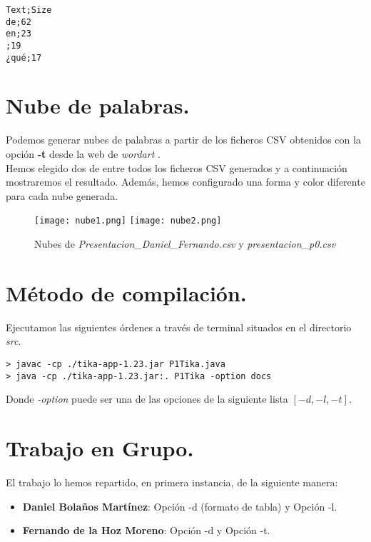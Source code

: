 \documentclass[12pt]{article}
\begin{document}
\begin{lstlisting}
Text;Size
de;62
en;23
;19
¿qué;17
\end{lstlisting}


\section{Nube de palabras.}

Podemos generar nubes de palabras a partir de los ficheros CSV obtenidos con la opción \textbf{-t} desde la web de \textit{wordart} \cite{Nube}.\\

Hemos elegido dos de entre todos los ficheros CSV generados y a continuación mostraremos el resultado. Además, hemos configurado una forma y color diferente para cada nube generada.

\clearpage

\begin{figure}[h]
\centering
\texttt{[image: nube1.png]}
\texttt{[image: nube2.png]}
\label{nubes}
\caption{Nubes de \textit{Presentacion\_Daniel\_Fernando.csv} y \textit{presentacion\_p0.csv}}
\end{figure}
\clearpage

\section{Método de compilación.}

Ejecutamos las siguientes órdenes a través de terminal situados en el directorio \textit{src}.

\begin{lstlisting}
> javac -cp ./tika-app-1.23.jar P1Tika.java
> java -cp ./tika-app-1.23.jar:. P1Tika -option docs
\end{lstlisting}

Donde \textit{-option} puede ser una de las opciones de la siguiente lista $[-d,-l,-t]$.

\section{Trabajo en Grupo.}

El trabajo lo hemos repartido, en primera instancia, de la siguiente manera:

\begin{itemize}
\item \textbf{Daniel Bolaños Martínez}: Opción -d (formato de tabla) y  Opción -l.
\item \textbf{Fernando de la Hoz Moreno}: Opción -d y Opción -t.
\end{itemize}
\end{document}
